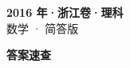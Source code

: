 \documentclass[zihao=-4, a4paper]{ctexart}
\begin{document}
\begin{center}
  {\Large\bfseries 2016 年·浙江卷·理科}\\[4pt]
  {\large 数学 · 简答版}
\end{center}
\medskip
{}

\clearpage
{}
\begin{center}{\Large\bfseries 答案速查}\end{center}
\medskip

\end{document}
